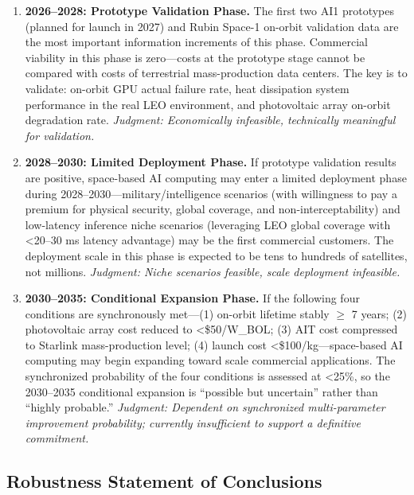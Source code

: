 \begin{enumerate}[leftmargin=*]
    \item \textbf{2026--2028: Prototype Validation Phase.} The first two AI1 prototypes (planned for launch in 2027) and Rubin Space-1 on-orbit validation data are the most important information increments of this phase. Commercial viability in this phase is zero---costs at the prototype stage cannot be compared with costs of terrestrial mass-production data centers. The key is to validate: on-orbit GPU actual failure rate, heat dissipation system performance in the real LEO environment, and photovoltaic array on-orbit degradation rate. \emph{Judgment: Economically infeasible, technically meaningful for validation.}

    \item \textbf{2028--2030: Limited Deployment Phase.} If prototype validation results are positive, space-based AI computing may enter a limited deployment phase during 2028--2030---military/intelligence scenarios (with willingness to pay a premium for physical security, global coverage, and non-interceptability) and low-latency inference niche scenarios (leveraging LEO global coverage with <20--30 ms latency advantage) may be the first commercial customers. The deployment scale in this phase is expected to be tens to hundreds of satellites, not millions. \emph{Judgment: Niche scenarios feasible, scale deployment infeasible.}

    \item \textbf{2030--2035: Conditional Expansion Phase.} If the following four conditions are synchronously met---(1) on-orbit lifetime stably $\geq$ 7 years; (2) photovoltaic array cost reduced to <\$50/W\_BOL; (3) AIT cost compressed to Starlink mass-production level; (4) launch cost <\$100/kg---space-based AI computing may begin expanding toward scale commercial applications. The synchronized probability of the four conditions is assessed at <25\%, so the 2030--2035 conditional expansion is ``possible but uncertain'' rather than ``highly probable.'' \emph{Judgment: Dependent on synchronized multi-parameter improvement probability; currently insufficient to support a definitive commitment.}
\end{enumerate}

\subsection{Robustness Statement of Conclusions}

